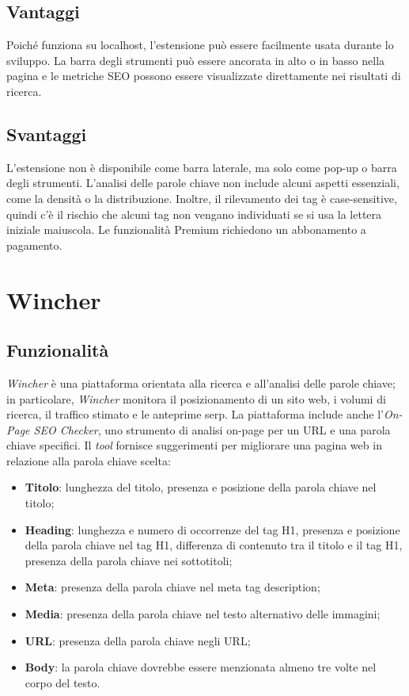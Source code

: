 \subsection{Vantaggi}
\par Poiché funziona su \gls{localhost}, l'estensione può essere facilmente usata durante lo sviluppo. La barra degli strumenti può essere ancorata in alto o in basso nella pagina e le metriche SEO possono essere visualizzate direttamente nei risultati di ricerca.

\subsection{Svantaggi}
\par L'estensione non è disponibile come barra laterale, ma solo come pop-up o barra degli strumenti. L'analisi delle parole chiave non include alcuni aspetti essenziali, come la densità o la distribuzione. Inoltre, il rilevamento dei tag è \gls{case-sensitive}, quindi c'è il rischio che alcuni tag non vengano individuati se si usa la lettera iniziale maiuscola. Le funzionalità Premium richiedono un abbonamento a pagamento. 

\section{Wincher}

\subsection{Funzionalità}
\par \textit{Wincher} è una piattaforma orientata alla ricerca e all'analisi delle parole chiave; in particolare, \textit{Wincher} monitora il posizionamento di un sito web, i volumi di ricerca, il traffico stimato e le anteprime \gls{serp}. La piattaforma include anche l'\textit{On-Page SEO Checker}, uno strumento di analisi \gls{on-page} per un URL e una parola chiave specifici. Il \textit{tool} fornisce suggerimenti per migliorare una pagina web in relazione alla parola chiave scelta:
\begin{itemize}
    \item \textbf{Titolo}: lunghezza del titolo, presenza e posizione della parola chiave nel titolo;
    \item \textbf{Heading}: lunghezza e numero di occorrenze del tag H1, presenza e posizione della parola chiave nel tag H1, differenza di contenuto tra il titolo e il tag H1, presenza della parola chiave nei sottotitoli;
    \item \textbf{Meta}: presenza della parola chiave nel meta tag description;
    \item \textbf{Media}: presenza della parola chiave nel testo alternativo delle immagini;
    \item \textbf{URL}: presenza della parola chiave negli URL;
    \item \textbf{Body}: la parola chiave dovrebbe essere menzionata almeno tre volte nel corpo del testo.
\end{itemize}

